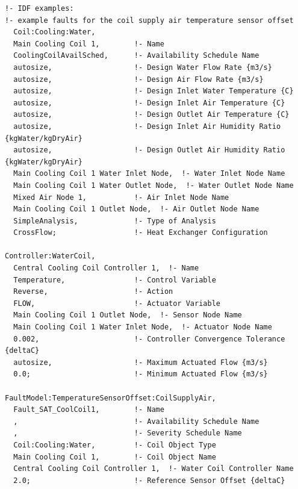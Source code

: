 \begin{lstlisting}
!- IDF examples:
!- example faults for the coil supply air temperature sensor offset
  Coil:Cooling:Water,
  Main Cooling Coil 1,        !- Name
  CoolingCoilAvailSched,      !- Availability Schedule Name
  autosize,                   !- Design Water Flow Rate {m3/s}
  autosize,                   !- Design Air Flow Rate {m3/s}
  autosize,                   !- Design Inlet Water Temperature {C}
  autosize,                   !- Design Inlet Air Temperature {C}
  autosize,                   !- Design Outlet Air Temperature {C}
  autosize,                   !- Design Inlet Air Humidity Ratio {kgWater/kgDryAir}
  autosize,                   !- Design Outlet Air Humidity Ratio {kgWater/kgDryAir}
  Main Cooling Coil 1 Water Inlet Node,  !- Water Inlet Node Name
  Main Cooling Coil 1 Water Outlet Node,  !- Water Outlet Node Name
  Mixed Air Node 1,           !- Air Inlet Node Name
  Main Cooling Coil 1 Outlet Node,  !- Air Outlet Node Name
  SimpleAnalysis,             !- Type of Analysis
  CrossFlow;                  !- Heat Exchanger Configuration

Controller:WaterCoil,
  Central Cooling Coil Controller 1,  !- Name
  Temperature,                !- Control Variable
  Reverse,                    !- Action
  FLOW,                       !- Actuator Variable
  Main Cooling Coil 1 Outlet Node,  !- Sensor Node Name
  Main Cooling Coil 1 Water Inlet Node,  !- Actuator Node Name
  0.002,                      !- Controller Convergence Tolerance {deltaC}
  autosize,                   !- Maximum Actuated Flow {m3/s}
  0.0;                        !- Minimum Actuated Flow {m3/s}

FaultModel:TemperatureSensorOffset:CoilSupplyAir,
  Fault_SAT_CoolCoil1,        !- Name
  ,                           !- Availability Schedule Name
  ,                           !- Severity Schedule Name
  Coil:Cooling:Water,         !- Coil Object Type
  Main Cooling Coil 1,        !- Coil Object Name
  Central Cooling Coil Controller 1,  !- Water Coil Controller Name
  2.0;                        !- Reference Sensor Offset {deltaC}
\end{lstlisting}
